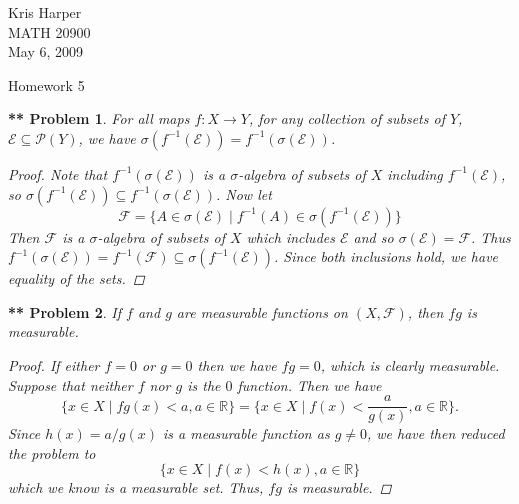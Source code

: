 \documentclass{article}
\newtheorem{**}{** Problem}
\begin{document}
\begin{flushright}
Kris Harper\\

MATH 20900\\

May 6, 2009
\end{flushright}

\begin{center}
Homework 5
\end{center}

\begin{**}
For all maps $f : X \rightarrow Y$, for any collection of subsets of $Y$, $\mathcal{E} \subseteq \mathcal{P}(Y)$, we have $\sigma(f^{-1}(\mathcal{E})) = f^{-1}(\sigma(\mathcal{E}))$.
\begin{proof}
Note that $f^{-1}(\sigma(\mathcal{E}))$ is a $\sigma$-algebra of subsets of $X$ including $f^{-1}(\mathcal{E})$, so $\sigma(f^{-1}(\mathcal{E})) \subseteq f^{-1}(\sigma(\mathcal{E}))$. Now let
\[
\mathcal{F} = \{A \in \sigma(\mathcal{E}) \mid f^{-1}(A) \in \sigma(f^{-1}(\mathcal{E}))\}
\]
Then $\mathcal{F}$ is a $\sigma$-algebra of subsets of $X$ which includes $\mathcal{E}$ and so $\sigma(\mathcal{E}) = \mathcal{F}$. Thus $f^{-1}(\sigma(\mathcal{E})) = f^{-1}(\mathcal{F}) \subseteq \sigma(f^{-1}(\mathcal{E}))$. Since both inclusions hold, we have equality of the sets.
\end{proof}
\end{**}

\begin{**}
If $f$ and $g$ are measurable functions on $(X, \mathcal{F})$, then $fg$ is measurable.
\begin{proof}
If either $f = 0$ or $g = 0$ then we have $fg = 0$, which is clearly measurable. Suppose that neither $f$ nor $g$ is the $0$ function. Then we have
\[
\{x \in X \mid fg(x) < a, a \in \mathbb{R}\} = \{x \in X \mid f(x) < \frac{a}{g(x)}, a \in \mathbb{R}\}.
\]
Since $h(x) = a/g(x)$ is a measurable function as $g \neq 0$, we have then reduced the problem to
\[
\{x \in X \mid f(x) < h(x), a \in \mathbb{R}\}
\]
which we know is a measurable set. Thus, $fg$ is measurable.
\end{proof}
\end{**}
\end{document}
